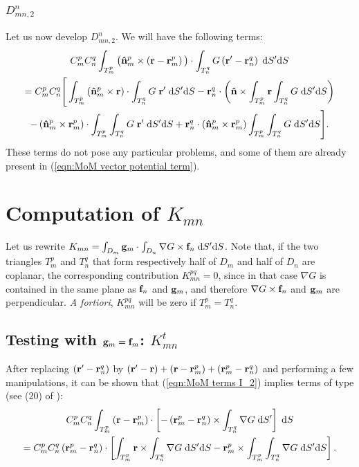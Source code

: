 \subsubsection{$D_{mn,2}^n$}
%
\par
Let us now develop $D_{mn,2}^n$. We will have the following terms:
\begin{multline}
C_m^p C_n^q \int_{T_m^p} \big( \mathbf{\Hat{n}}_m^p \times \left(\mathbf{r} - \mathbf{r}_m^p \right)\big) \cdot \int_{T_n^q} G \left(\mathbf{r}'-\mathbf{r}_n^q \right) \; \text{d} S' \text{d} S \\
= C_m^p C_n^q  \Bigg[\int_{T_m^p} \left(\mathbf{\Hat{n}}_m^p \times \mathbf{r} \right) \cdot \int_{T_n^q} G \; \mathbf{r}' \; \text{d} S' \text{d} S - \mathbf{r}_n^q \cdot \left(\mathbf{\Hat{n}} \times \int_{T_m^p} \mathbf{r} \int_{T_n^q} G \; \text{d} S' \text{d} S \right)  \\
- \left(\mathbf{\Hat{n}}_m^p \times \mathbf{r}_m^p\right)  \cdot \int_{T_m^p} \int_{T_n^q} G \; \mathbf{r}'\; \text{d} S' \text{d} S + \mathbf{r}_n^q \cdot \left(\mathbf{\Hat{n}}_m^p \times \mathbf{r}_m^p\right) \int_{T_m^p} \int_{T_n^q} G \; \text{d} S' \text{d} S \Bigg].
\end{multline}
These terms do not pose any particular problems, and some of them are already present in (\ref{eqn:MoM vector potential term}).

\section{Computation of $K_{mn}$}
%
\par
Let us rewrite $K_{mn} = \int_{D_m} \mathbf{g}_m \cdot \int_{D_n} \nabla G \times \mathbf{f}_n \; \text{d} S' \text{d} S$. Note that, if the two triangles $T_m^p$ and $T_n^q$ that form respectively half of $D_m$ and half of $D_n$ are coplanar, the corresponding contribution $K_{mn}^{pq} = 0$, since in that case $\nabla G$ is contained in the same plane as $\mathbf{f}_n$ and $\mathbf{g}_m$, and therefore $\nabla G \times \mathbf{f}_n$ and $\mathbf{g}_m$ are perpendicular. \textit{A fortiori}, $K_{mn}^{pq}$ will be zero if $T_m^p = T_n^q$.

\subsection{Testing with $\mathbf{g}_m = \mathbf{f}_m$: $K_{mn}^t$}
%
\par
After replacing $\left(\mathbf{r}' - \mathbf{r}_n^q\right)$ by $\left(\mathbf{r}' - \mathbf{r}\right) + \left(\mathbf{r} - \mathbf{r}_m^p\right) + \left(\mathbf{r}_m^p - \mathbf{r}_n^q\right)$ and performing a few manipulations, it can be shown that (\ref{eqn:MoM terms I_2}) implies terms of type (see (20) of \cite{Taskinen_03}):
\begin{multline} \label{eqn:G_HJ_fs_testing_decomposition}
C_m^p C_n^q \int_{T_m^p} \left(\mathbf{r} - \mathbf{r}_m^p \right) \cdot \left[-\left(\mathbf{r}_m^p - \mathbf{r}_n^q\right) \times \int_{T_n^q} \nabla G \; \text{d} S'\right] \; \text{d} S \\
= C_m^p C_n^q \left(\mathbf{r}_m^p - \mathbf{r}_n^q\right) \cdot \left[\int_{T_m^p} \mathbf{r} \times \int_{T_n^q} \nabla G \; \text{d} S' \text{d} S - \mathbf{r}_m^p \times \int_{T_m^p} \int_{T_n^q}\nabla G \; \text{d} S' \text{d} S \right].
\end{multline}

